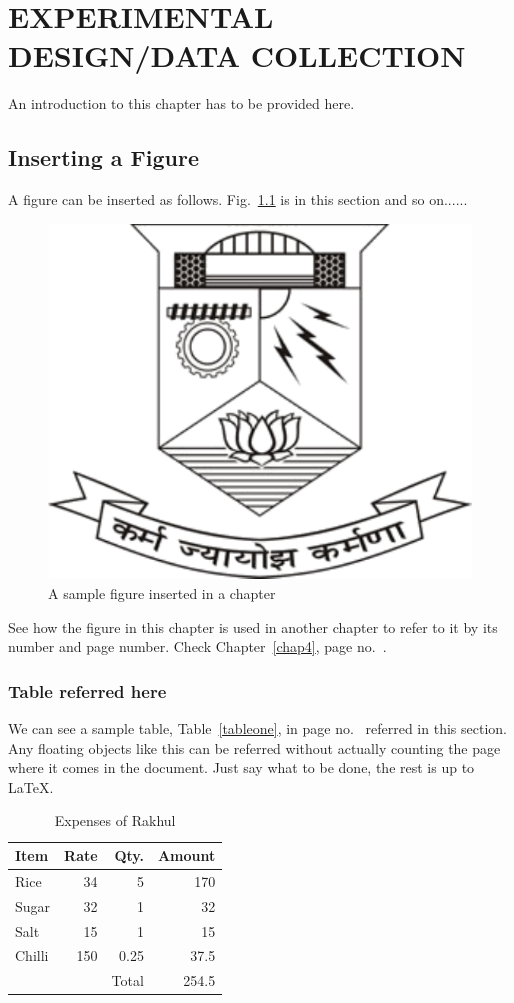 \chapter{EXPERIMENTAL DESIGN/DATA COLLECTION}\label{chap3}
\thispagestyle{empty}

An introduction to this chapter has to be provided here. 
\section{Inserting a Figure}

A figure can be inserted as follows. Fig.~\ref{figureone} is in this section and so on......

\begin{figure}[h!]
\centering
\includegraphics[width=0.4\linewidth]{./picture-files/logo}
\caption[A sample figure]{A sample figure inserted in a chapter}
\label{figureone}
\end{figure}

See how the figure in this chapter is used in another chapter to refer to it by its number and page number. Check Chapter~\ref{chap4}, page no.~\pageref{chap4}.

\subsection{Table referred here}
We can see a sample table, Table~\ref{tableone}, in page no.~\pageref{tableone} referred in this section. Any floating objects like this can be referred without actually counting the page where it comes in the document. Just say what to be done, the rest is up to \LaTeX. %
\begin{table}[h!]\centering \caption{Expenses of Rakhul}\label{tab-exp}
\begin{tabular}{|l|r|r|r|}
\hline 
Item	&	Rate	&	Qty.	&	Amount	\\ \hline
Rice	&	34	&	5	&	170	\\ \hline
Sugar	&	32	&	1	&	32	\\ \hline
Salt	&	15	&	1	&	15	\\ \hline
Chilli	&	150	&	0.25	&	37.5	\\ \hline
	&		&	Total	&	254.5	\\ 
	\hline
\end{tabular}

\end{table}

